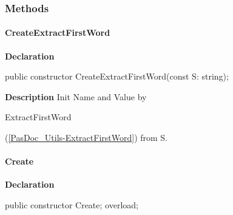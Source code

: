 \documentclass{report}
\newif\ifpdf
\begin{document}
\subsubsection*{\large{\textbf{Methods}}\normalsize\hspace{1ex}\hfill}
\paragraph*{CreateExtractFirstWord}\hspace*{\fill}

\label{PasDoc_StringPairVector.TStringPair-CreateExtractFirstWord}
\begin{list}{}{
\setlength{\itemindent}{0cm}
\setlength{\listparindent}{0cm}
\setlength{\leftmargin}{\evensidemargin}
\addtolength{\leftmargin}{\tmplength}
\settowidth{\labelsep}{X}
\addtolength{\leftmargin}{\labelsep}
\setlength{\labelwidth}{\tmplength}
}
\item[\textbf{Declaration}\hfill]
\ifpdf
\begin{flushleft}
\fi
\begin{ttfamily}
public constructor CreateExtractFirstWord(const S: string);\end{ttfamily}

\ifpdf
\end{flushleft}
\fi

\par
\item[\textbf{Description}]
Init Name and Value by \begin{ttfamily}ExtractFirstWord\end{ttfamily}(\ref{PasDoc_Utils-ExtractFirstWord}) from S.

\end{list}
\paragraph*{Create}\hspace*{\fill}

\label{PasDoc_StringPairVector.TStringPair-Create}
\begin{list}{}{
\setlength{\itemindent}{0cm}
\setlength{\listparindent}{0cm}
\setlength{\leftmargin}{\evensidemargin}
\addtolength{\leftmargin}{\tmplength}
\settowidth{\labelsep}{X}
\addtolength{\leftmargin}{\labelsep}
\setlength{\labelwidth}{\tmplength}
}
\item[\textbf{Declaration}\hfill]
\ifpdf
\begin{flushleft}
\fi
\begin{ttfamily}
public constructor Create; overload;\end{ttfamily}

\ifpdf
\end{flushleft}
\fi

\end{list}
\end{document}
